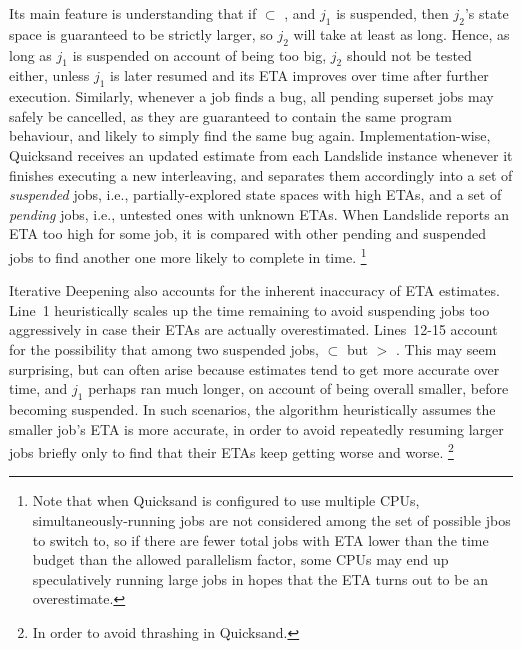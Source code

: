 Its main feature is understanding that if  $\subset$ ,
and $j_1$ is suspended,
then $j_2$'s state space is guaranteed to be strictly larger, so $j_2$ will take at least as long.
Hence, as long as $j_1$ is suspended on account of being too big,
$j_2$ should not be tested either,
unless $j_1$ is later resumed and its ETA improves over time after further execution.
Similarly, whenever a job finds a bug, all pending superset jobs may safely be cancelled,
as they are guaranteed to contain the same program behaviour, and likely to simply find the same bug again.
%
Implementation-wise,
Quicksand receives an updated estimate from each Landslide instance whenever it finishes executing a new interleaving,
and separates them accordingly
into a set of {\em suspended} jobs,
i.e., partially-explored state spaces with high ETAs,
and a set of {\em pending} jobs,
i.e., untested ones with unknown ETAs.
When Landslide reports an ETA too high for some job,
it is compared with other pending and suspended jobs to find another one more likely to complete in time.%
\footnote{Note that when Quicksand is configured to use multiple CPUs,
simultaneously-running jobs are not considered among the set of possible jbos to switch to,
so if there are fewer total jobs with ETA lower than the time budget than the allowed parallelism factor,
some CPUs may end up speculatively running large jobs
in hopes that the ETA turns out to be an overestimate.}

Iterative Deepening also accounts for the inherent inaccuracy of ETA estimates.
Line~1 heuristically scales up the time remaining to avoid suspending jobs too aggressively
in case their ETAs are actually overestimated.
Lines~12-15 account for the
possibility that among two suspended jobs,
 $\subset$ 
but
 $>$ .
This may seem surprising,
but can often arise because estimates tend to get more accurate over time,
and $j_1$ perhaps ran much longer, on account of being overall smaller,
before becoming suspended.
In such scenarios,
the algorithm heuristically assumes the smaller job's ETA is more accurate,
in order to avoid repeatedly resuming larger jobs briefly only to find that their ETAs keep getting worse and worse.%
\footnote{In order to avoid thrashing in Quicksand.} %


